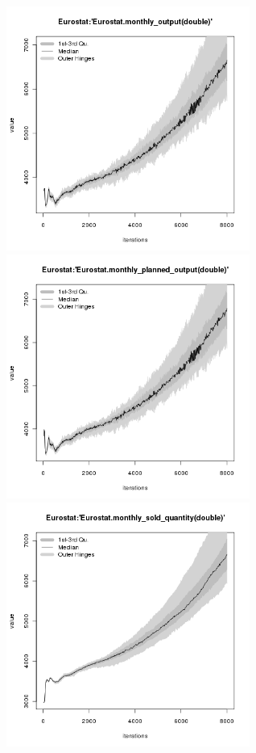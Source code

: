 \begin{figure}[H!]
\centering\leavevmode
\begin{minipage}{17cm}
\centering\leavevmode
\includegraphics[width=8cm]{./benchmark_plots/Eurostat-monthly_output.png}
\includegraphics[width=8cm]{./benchmark_plots/Eurostat-monthly_planned_output.png}\\
\includegraphics[width=8cm]{./benchmark_plots/Eurostat-monthly_sold_quantity.png}

\end{minipage}
\end{figure}
